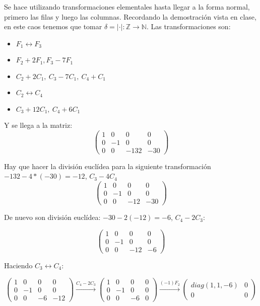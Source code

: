 \documentclass[openany]{book}
\begin{document}
\begin{exercise}
    $ $

    Se hace utilizando transformaciones elementales hasta llegar a la forma normal, primero las filas y luego las columnas. Recordando la demostración vista en clase, en este caos tenemos que tomar $ \delta = |\cdot |: \mathbb{Z} \to \mathbb{N} $. Las transformaciones son:
    \begin{itemize}
        \item $ F_1 \leftrightarrow F_3$
        \item $ F_2+2F_1, F_3-7F_1$
        \item $C_2+2C_1,\ C_3-7C_1,\ C_4+C_1$
        \item $ C_2 \leftrightarrow C_4$
        \item $ C_3+12C_1,\ C_4+6C_1$
    \end{itemize}

    Y se llega a la matriz:
    $$ \begin{pmatrix} 1 & 0 & 0 & 0\\ 
    0 & -1 & 0 & 0 \\ 
0 & 0 & -132 & -30 \end{pmatrix}  $$

Hay que hacer la división euclídea para la siguiente transformación $ -132 -4*(-30) = -12$, $ C_3-4C_4$
$$ \begin{pmatrix} 1 & 0 & 0 & 0\\ 
0 & -1 & 0 & 0 \\ 
0 & 0 & -12 & -30 \end{pmatrix}  $$

De nuevo son división euclídea: $ -30 -2(-12) = -6$, $ C_4-2C_3$:

$$ \begin{pmatrix} 1 & 0 & 0 & 0\\ 
0 & -1 & 0 & 0 \\ 
0 & 0 & -12 & -6 \end{pmatrix}  $$

Haciendo $ C_3 \leftrightarrow C_4$:

$$ \begin{pmatrix} 1 & 0 & 0 & 0\\ 
0 & -1 & 0 & 0 \\ 
0 & 0 & -6 & -12 \end{pmatrix} \xrightarrow{C_4-2C_3} \begin{pmatrix} 1 & 0 & 0 & 0\\ 0 & -1 & 0 & 0\\ 0 & 0 & -6 & 0 \end{pmatrix} \xrightarrow{(-1)F_2} \begin{pmatrix} diag(1,1,-6) & 0 \\ 0 & 0 \end{pmatrix}  $$


\end{exercise}
\end{document}
